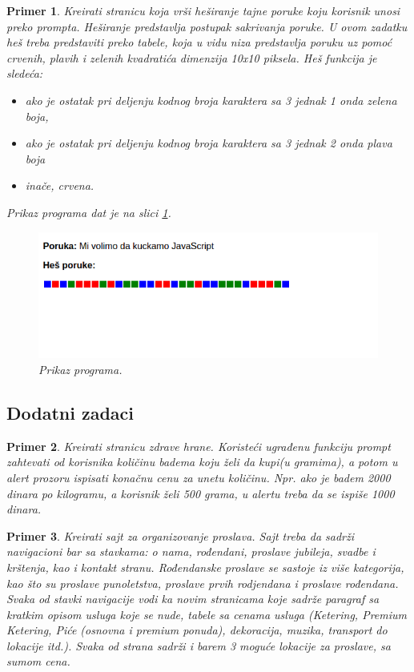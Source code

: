 \documentclass[a4paper]{article}
\newtheorem{primer}{Primer}[section]
\begin{document}
\begin{primer}
Kreirati stranicu koja vrši heširanje tajne poruke koju korisnik unosi preko prompta. Heširanje predstavlja postupak sakrivanja poruke. U ovom zadatku heš treba predstaviti preko tabele, koja u vidu niza predstavlja poruku uz pomoć crvenih, plavih i zelenih kvadratića dimenzija 10x10 piksela. Heš funkcija je sledeća:
\begin{itemize}
\item ako je ostatak pri deljenju kodnog broja karaktera sa 3 jednak 1 onda zelena boja,
\item ako je ostatak pri deljenju kodnog broja karaktera sa 3 jednak 2 onda plava boja
\item inače, crvena. 
\end{itemize}
Prikaz programa dat je na slici \ref{fig:hes}.
\begin{figure}[h!]
\begin{center}
\includegraphics[scale=0.5]{pictures/hes.png}
\end{center}
\caption{Prikaz programa.}
\label{fig:hes}
\end{figure}

\end{primer}



\subsection{Dodatni zadaci}
\begin{primer}
Kreirati stranicu zdrave hrane. Koristeći ugrađenu funkciju prompt zahtevati od korisnika količinu badema koju želi da kupi(u gramima), a potom u alert prozoru ispisati konačnu cenu za unetu količinu. Npr. ako je badem 2000 dinara po kilogramu, a korisnik želi 500 grama, u alertu treba da se ispiše 1000 dinara.  
\end{primer}

\begin{primer}
Kreirati sajt za organizovanje proslava. Sajt treba da sadrži navigacioni bar sa stavkama: o nama, rođendani, proslave jubileja, svadbe i krštenja, kao i kontakt stranu. Rođendanske proslave se sastoje iz više kategorija, kao što su proslave punoletstva, proslave prvih rodjendana i proslave rođendana. Svaka od stavki navigacije vodi ka novim stranicama koje sadrže paragraf sa kratkim opisom usluga koje se nude, tabele sa cenama usluga (Ketering, Premium Ketering, Piće (osnovna i premium ponuda), dekoracija, muzika, transport do lokacije itd.). Svaka od strana sadrži i barem 3 moguće lokacije za proslave, sa sumom cena.

\end{primer}
\end{document}
